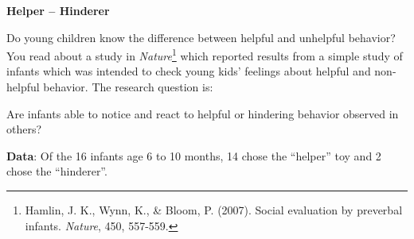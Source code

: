 
\def\theTopic{Helper--Hinderer }
\def\dayNum{4}


\begin{center}
\vspace*{-.2in}
{\bf {\large Helper -- Hinderer}}\\
\end{center}

Do young children know the difference between helpful and unhelpful
behavior?  You read about a study in   {\it Nature}\footnote{ Hamlin, J. K.,
  Wynn, K., \& Bloom, P. (2007). Social evaluation by preverbal
  infants. {\it Nature}, 450, 557-559. } which
reported results from a simple study of infants which was intended to
check young kids' feelings about helpful and non-helpful behavior.  
  The research question is:
\begin{center}
  {\sf Are infants able to notice and react to helpful or hindering
    behavior observed in others?} 
\end{center}

{\bf Data}:  Of the 16 infants age 6 to 10 months, 14 chose the ``helper'' toy
and 2 chose the ``hinderer''.

